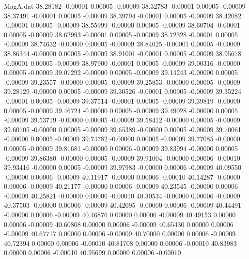 \begin{filecontents}{MagA.dat}
  38.28182   -0.00001    0.00005   -0.00009
  38.32783   -0.00001    0.00005   -0.00009
  38.37491   -0.00001    0.00005   -0.00009
  38.39794   -0.00001    0.00005   -0.00009
  38.42082   -0.00001    0.00005   -0.00009
  38.55999   -0.00000    0.00005   -0.00009
  38.60704   -0.00001    0.00005   -0.00009
  38.62993   -0.00001    0.00005   -0.00009
  38.72328   -0.00001    0.00005   -0.00009
  38.74632   -0.00000    0.00005   -0.00009
  38.84025   -0.00001    0.00005   -0.00009
  38.86344   -0.00000    0.00005   -0.00009
  38.91001   -0.00001    0.00005   -0.00009
  38.95678   -0.00001    0.00005   -0.00009
  38.97900   -0.00001    0.00005   -0.00009
  39.00316   -0.00000    0.00005   -0.00009
  39.07292   -0.00000    0.00005   -0.00009
  39.14243   -0.00000    0.00005   -0.00009
  39.23557   -0.00000    0.00005   -0.00009
  39.25853   -0.00000    0.00005   -0.00009
  39.28129   -0.00000    0.00005   -0.00009
  39.30526   -0.00001    0.00005   -0.00009
  39.35224   -0.00001    0.00005   -0.00009
  39.37514   -0.00001    0.00005   -0.00009
  39.39819   -0.00000    0.00005   -0.00009
  39.46724   -0.00000    0.00005   -0.00009
  39.49028   -0.00000    0.00005   -0.00009
  39.53719   -0.00000    0.00005   -0.00009
  39.58412   -0.00000    0.00005   -0.00009
  39.60705   -0.00000    0.00005   -0.00009
  39.65389   -0.00000    0.00005   -0.00009
  39.70061   -0.00000    0.00005   -0.00009
  39.74782   -0.00000    0.00005   -0.00009
  39.77085   -0.00000    0.00005   -0.00009
  39.81681   -0.00000    0.00006   -0.00009
  39.83994   -0.00000    0.00005   -0.00009
  39.86380   -0.00000    0.00005   -0.00009
  39.91004   -0.00000    0.00006   -0.00010
  39.93416   -0.00000    0.00005   -0.00009
  39.97983   -0.00000    0.00006   -0.00009
  40.09550   -0.00000    0.00006   -0.00009
  40.11917   -0.00000    0.00006   -0.00010
  40.14287   -0.00000    0.00006   -0.00009
  40.21177   -0.00000    0.00006   -0.00009
  40.23545   -0.00000    0.00006   -0.00009
  40.25821   -0.00000    0.00006   -0.00010
  40.30534   -0.00000    0.00006   -0.00009
  40.37503   -0.00000    0.00006   -0.00009
  40.42095   -0.00000    0.00006   -0.00009
  40.44491   -0.00000    0.00006   -0.00009
  40.46876    0.00000    0.00006   -0.00009
  40.49153    0.00000    0.00006   -0.00009
  40.60808    0.00000    0.00006   -0.00009
  40.65430    0.00000    0.00006   -0.00009
  40.67717    0.00000    0.00006   -0.00009
  40.70000    0.00000    0.00006   -0.00009
  40.72394    0.00000    0.00006   -0.00010
  40.81708    0.00000    0.00006   -0.00010
  40.83983    0.00000    0.00006   -0.00010
  40.95699    0.00000    0.00006   -0.00010

\end{filecontents}
